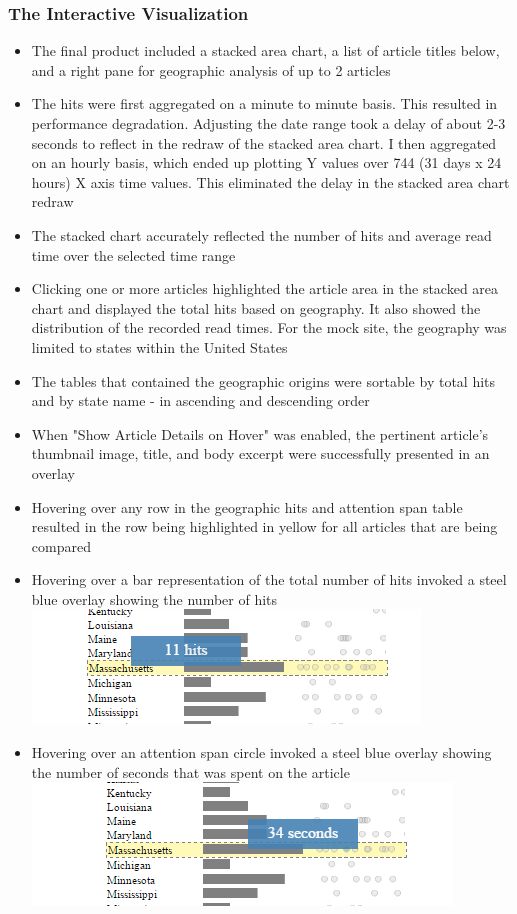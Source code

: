 \documentclass[12pt]{article}
\begin{document}
\subsubsection{The Interactive Visualization}
\begin{itemize}
\item The final product included a stacked area chart, a list of article titles below, and a right pane for geographic analysis of up to 2 articles
\item The hits were first aggregated on a minute to minute basis. This resulted in performance degradation. Adjusting the date range took a delay of about 2-3 seconds to reflect in the redraw of the stacked area chart. I then aggregated on an hourly basis, which ended up plotting Y values over 744 (31 days x 24 hours) X axis time values. This eliminated the delay in the stacked area chart redraw
\item The stacked chart accurately reflected the number of hits and average read time over the selected time range
\item Clicking one or more articles highlighted the article area in the stacked area chart and displayed the total hits based on geography. It also showed the distribution of the recorded read times. For the mock site, the geography was limited to states within the United States
\item The tables that contained the geographic origins were sortable by total hits and by state name - in ascending and descending order
\item When "Show Article Details on Hover" was enabled, the pertinent article's thumbnail image, title, and body excerpt were successfully presented in an overlay
\item Hovering over any row in the geographic hits and attention span table resulted in the row being highlighted in yellow for all articles that are being compared
\item Hovering over a bar representation of the total number of hits invoked a steel blue overlay showing the number of hits
\\
\noindent\includegraphics[scale=0.8]{img/state_hit_hover} \\  

\item Hovering over an attention span circle invoked a steel blue overlay showing the number of seconds that was spent on the article
\noindent\includegraphics[scale=0.8]{img/state_circle_hover} \\  
\end{itemize} 
\end{document}
